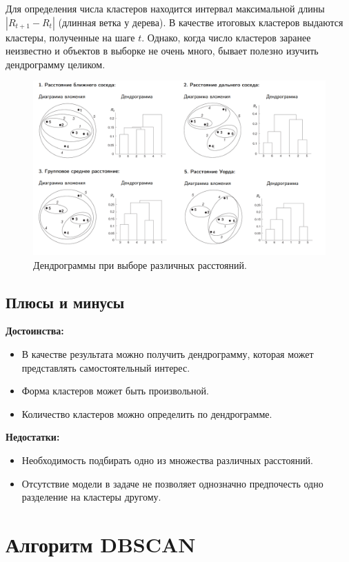 \documentclass[10pt]{article}
\begin{document}
Для определения числа кластеров находится интервал максимальной длины $|R_{t+1}-R_t|$ (длинная ветка у дерева). В качестве итоговых кластеров выдаются кластеры, полученные на шаге $t$. Однако, когда число кластеров заранее неизвестно и объектов в выборке не очень много, бывает полезно изучить дендрограмму целиком.

\begin{figure}[H]
	\centering
	\includegraphics[scale=0.2]{hier.png}
	\caption{Дендрограммы при выборе различных расстояний.}
\end{figure}


\subsection{Плюсы и минусы}
\textbf{Достоинства:}
\begin{itemize}
	\item В качестве результата можно получить дендрограмму, которая может представлять самостоятельный интерес. 
	\item Форма кластеров может быть произвольной.
	\item Количество кластеров можно определить по дендрограмме.
\end{itemize}

\textbf{Недостатки:}
\begin{itemize}
	\item Необходимость подбирать одно из множества различных расстояний.
	\item Отсутствие модели в задаче не позволяет однозначно предпочесть одно разделение на кластеры другому.	
\end{itemize}


	
\section{Алгоритм DBSCAN}
\end{document}
